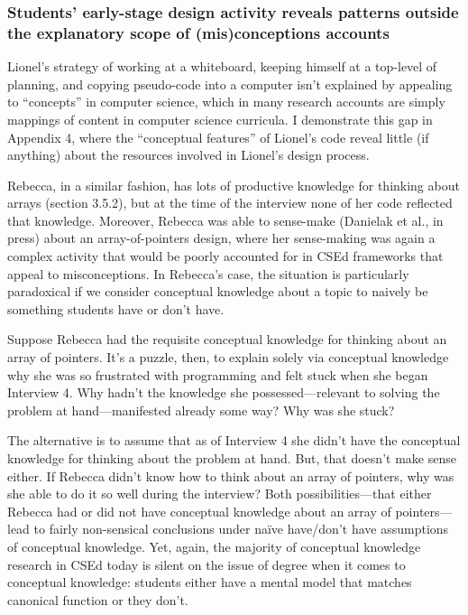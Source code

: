 \subsubsection{Students' early-stage design activity reveals patterns
outside the explanatory scope of (mis)conceptions
accounts}\label{students-early-stage-design-activity-reveals-patterns-outside-the-explanatory-scope-of-misconceptions-accounts}

Lionel's strategy of working at a whiteboard, keeping himself at a
top-level of planning, and copying pseudo-code into a computer isn't
explained by appealing to ``concepts'' in computer science, which in
many research accounts are simply mappings of content in computer
science curricula. I demonstrate this gap in Appendix 4, where the
``conceptual features'' of Lionel's code reveal little (if anything)
about the resources involved in Lionel's design process.

Rebecca, in a similar fashion, has lots of productive knowledge for
thinking about arrays (section 3.5.2), but at the time of the interview
none of her code reflected that knowledge. Moreover, Rebecca was able to
sense-make (Danielak et al., in press) about an array-of-pointers
design, where her sense-making was again a complex activity that would
be poorly accounted for in CSEd frameworks that appeal to
misconceptions. In Rebecca's case, the situation is particularly
paradoxical if we consider conceptual knowledge about a topic to naively
be something students have or don't have.

Suppose Rebecca had the requisite conceptual knowledge for thinking
about an array of pointers. It's a puzzle, then, to explain solely via
conceptual knowledge why she was so frustrated with programming and felt
stuck when she began Interview 4. Why hadn't the knowledge she
possessed---relevant to solving the problem at hand---manifested already
some way? Why was she stuck?

The alternative is to assume that as of Interview 4 she didn't have the
conceptual knowledge for thinking about the problem at hand. But, that
doesn't make sense either. If Rebecca didn't know how to think about an
array of pointers, why was she able to do it so well during the
interview? Both possibilities---that either Rebecca had or did not have
conceptual knowledge about an array of pointers---lead to fairly
non-sensical conclusions under naïve have/don't have assumptions of
conceptual knowledge. Yet, again, the majority of conceptual knowledge
research in CSEd today is silent on the issue of degree when it comes to
conceptual knowledge: students either have a mental model that matches
canonical function or they don't.

